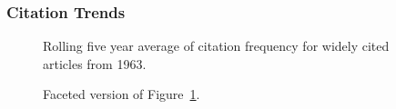 \documentclass[
  10pt,
  letterpaper,
  DIV=11,
  numbers=noendperiod,
  twoside]{scrartcl}
\begin{document}
\subsubsection*{Citation Trends}\label{sec-trends-1963}

\begin{figure}


\caption{\label{fig-citation-spaghetti-1963}Rolling five year average of
citation frequency for widely cited articles from 1963.}

\end{figure}%

\begin{figure}


\caption{\label{fig-citation-facet-1963}Faceted version of
Figure~\ref{fig-citation-spaghetti-1963}.}

\end{figure}%
\end{document}
